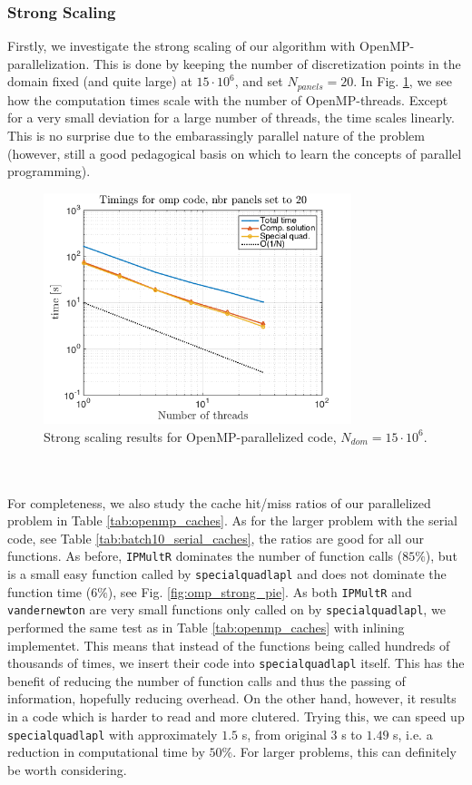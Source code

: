 \documentclass[a4paper,10pt]{article}
\def\code#1{\texttt{#1}}
\begin{document}
\subsubsection*{Strong Scaling}
Firstly, we investigate the strong scaling of our algorithm with OpenMP-parallelization. This is done by keeping the number of discretization points in the domain fixed (and quite large) at $15\cdot10^{6}$, and set $N_{panels}=20$. In Fig. \ref{fig:omp_strongtime}, we see how the computation times scale with the number of OpenMP-threads. Except for a very small deviation for a large number of threads, the time scales linearly. This is no surprise due to the embarassingly parallel nature of the problem (however, still a good pedagogical basis on which to learn the concepts of parallel programming). 
\begin{figure}[ht]
    \begin{center}
        \includegraphics[width=0.8\textwidth]{Graphics/omp_fixed_domain_size_loglog.png}
    \end{center}
    \caption{Strong scaling results for OpenMP-parallelized code, $N_{dom}=15\cdot 10^6$.}
    \label{fig:omp_strongtime}
\end{figure}
\\ \\
For completeness, we also study the cache hit/miss ratios of our parallelized problem in Table \ref{tab:openmp_caches}. As for the larger problem with the serial code, see Table \ref{tab:batch10_serial_caches}, the ratios are good for all our functions. As before, \texttt{IPMultR} dominates the number of function calls ($85\%$), but is a small easy function called by \texttt{specialquadlapl} and does not dominate the function time ($6\%$), see Fig. \ref{fig:omp_strong_pie}. As both \code{IPMultR} and \code{vandernewton} are very small functions only called on by \code{specialquadlapl}, we performed the same test as in Table \ref{tab:openmp_caches} with inlining implementet. This means that instead of the functions being called hundreds of thousands of times, we insert their code into \code{specialquadlapl} itself. This has the benefit of reducing the number of function calls and thus the passing of information, hopefully reducing overhead. On the other hand, however, it results in a code which is harder to read and more clutered. Trying this, we can speed up \code{specialquadlapl} with approximately $1.5$ s, from original $3$ s to $1.49$ s, i.e. a reduction in computational time by $50 \%$. For larger problems, this can definitely be worth considering.
\end{document}
